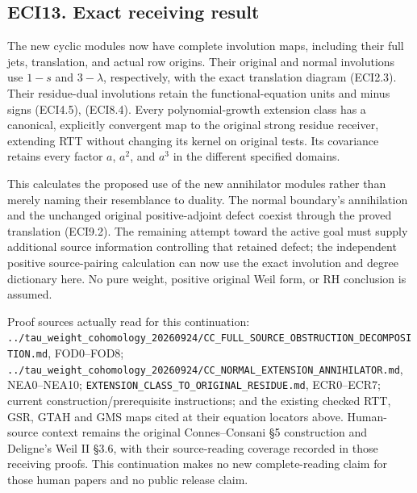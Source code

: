 \subsection{ECI13. Exact receiving
result}\label{eci13.-exact-receiving-result}

The new cyclic modules now have complete involution maps, including
their full jets, translation, and actual row origins. Their original and
normal involutions use \(1-s\) and \(3-\lambda\), respectively, with the
exact translation diagram (ECI2.3). Their residue-dual involutions
retain the functional-equation units and minus signs (ECI4.5), (ECI8.4).
Every polynomial-growth extension class has a canonical, explicitly
convergent map to the original strong residue receiver, extending RTT
without changing its kernel on original tests. Its covariance retains
every factor \(a\), \(a^2\), and \(a^3\) in the different specified
domains.

This calculates the proposed use of the new annihilator modules rather
than merely naming their resemblance to duality. The normal boundary's
annihilation and the unchanged original positive-adjoint defect coexist
through the proved translation (ECI9.2). The remaining attempt toward
the active goal must supply additional source information controlling
that retained defect; the independent positive source-pairing
calculation can now use the exact involution and degree dictionary here.
No pure weight, positive original Weil form, or RH conclusion is
assumed.

Proof sources actually read for this continuation:
\nolinkurl{../tau_weight_cohomology_20260924/CC_FULL_SOURCE_OBSTRUCTION_DECOMPOSITION.md},
FOD0--FOD8;
\nolinkurl{../tau_weight_cohomology_20260924/CC_NORMAL_EXTENSION_ANNIHILATOR.md},
NEA0--NEA10; \nolinkurl{EXTENSION_CLASS_TO_ORIGINAL_RESIDUE.md},
ECR0--ECR7; current construction/prerequisite instructions; and the
existing checked RTT, GSR, GTAH and GMS maps cited at their equation
locators above. Human-source context remains the original
Connes--Consani §5 construction and Deligne's Weil II §3.6, with their
source-reading coverage recorded in those receiving proofs. This
continuation makes no new complete-reading claim for those human papers
and no public release claim.
